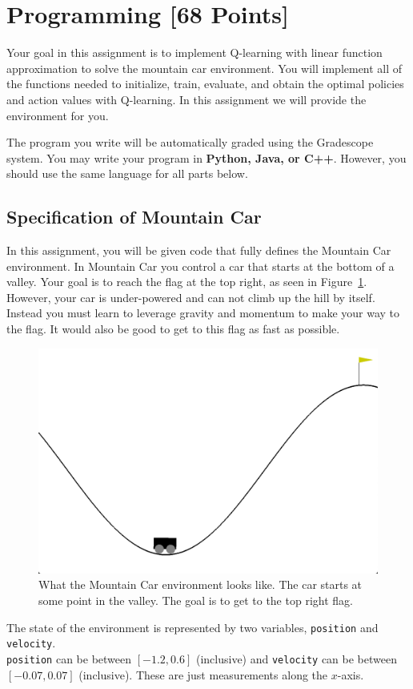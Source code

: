 \documentclass[11pt,addpoints,answers]{exam}
\begin{document}
\section{Programming [68 Points]}
\label{sec:code}

Your goal in this assignment is to implement Q-learning with linear function approximation to solve the mountain car environment. You will implement all of the functions needed to initialize, train, evaluate, and obtain the optimal policies and action values with Q-learning. In this assignment we will provide the environment for you.

The program you write will be automatically graded using the Gradescope system. You may write your program in \textbf{Python, Java, or C++}. However, you should use the same language for all parts below.

\subsection{Specification of Mountain Car}
In this assignment, you will be given code that fully defines the Mountain Car environment. In Mountain Car you control a car that starts at the bottom of a valley. Your goal is to reach the flag at the top right, as seen in Figure~\ref{fig:mountaincar}. However, your car is under-powered and can not climb up the hill by itself. Instead you must learn to leverage gravity and momentum to make your way to the flag. It would also be good to get to this flag as fast as possible.

\begin{figure}[H]
    \centering
    \includegraphics[width=0.5\linewidth]{figs/MountainCar.png}
    \caption{What the Mountain Car environment looks like. The car starts at some point in the valley. The goal is to get to the top right flag.}
    \label{fig:mountaincar}
\end{figure}

The state of the environment is represented by two variables, \texttt{position} and \texttt{velocity}.\\\texttt{position} can be between $[-1.2, 0.6]$ (inclusive) and \texttt{velocity} can be between $[-0.07, 0.07]$ (inclusive). These are just measurements along the $x$-axis.
\end{document}
